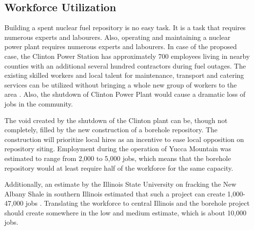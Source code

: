 \subsection{Workforce Utilization}



Building a spent nuclear fuel repository is no easy task. It is a task that requires
numerous experts and labourers. Also, operating and maintaining a nuclear power plant
requires numerous experts and labourers. In case of the proposed case, the Clinton
 Power Station has approximately 700 employees living in nearby counties with an
additional several hundred contractors during fuel 
outages\cite{exelon_clinton_2016}.
The existing skilled workers and local talent for maintenance, transport and catering
services can be utilized without bringing a whole new group of workers to the 
area \cite{iaea_managing_2008}. Also, the shutdown of Clinton Power Plant would cause a dramatic
loss of jobs in the community. 




The void created by the shutdown of the Clinton plant can be, though not
completely, filled by the new construction of a borehole repository. The construction
will prioritize local hires as an incentive to ease local opposition on repository
 siting. Employment during the operation of Yucca Mountain was estimated to range from
 2,000 to 5,000 jobs, \cite{riddel_economic_2003} which means that the borehole repository
 would at least require half of the workforce for the same capacity. 

Additionally, an estimate by the Illinois State University on fracking the New Albany
Shale in southern Illinois estimated that such a project can create 1,000-47,000 jobs
\cite{loomis_potential_2012}. Translating the workforce to central Illinois and the borehole
project should create somewhere in the low and medium estimate, which is about 10,000
jobs.   

%


